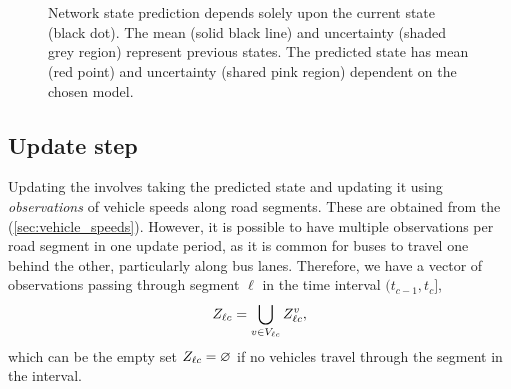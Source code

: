 \begin{knitrout}\small
{}\color{fgcolor}\begin{figure}

{\centering {}\\
\\

}

\caption[Network state prediction using constant speed and historical trend models]{Network state prediction depends solely upon the current state (black dot). The mean (solid black line) and uncertainty (shaded grey region) represent previous states. The predicted state has mean (red point) and uncertainty (shared pink region) dependent on the chosen model.}\label{fig:nw_kf}
\end{figure}


\end{knitrout}


\subsection{Update step}
\label{sec:kf_update}

Updating the \kf{} involves taking the predicted state and updating it using \emph{observations} of vehicle speeds along road segments. These are obtained from the \pf{} (\cref{sec:vehicle_speeds}). However, it is possible to have multiple observations per road segment in one update period, as it is common for buses to travel one behind the other, particularly along bus lanes. Therefore, we have a vector of observations passing through segment $\ell$ in the time interval $(t_{c-1}, t_c]$,
\begin{equation} \label{eq:nw_seg_obs}
Z_{\ell c} = \bigcup_{v\in V_{\ell c}} Z_{\ell c}^v,
\end{equation}
which can be the empty set $Z_{\ell c} = \varnothing$ if no vehicles travel through the segment in the interval.


